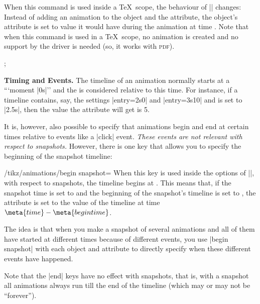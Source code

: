 \begin{command}{\pgfsnapshot{}}
    When this command is used inside a \TeX\ scope, the behaviour of
    |\pgfanimateattribute| changes: Instead of adding an animation to the
    object and the attribute, the object's attribute is set to value it would
    have during the animation at time . Note that when this command
    is used in a \TeX\ scope, no animation is created and no support by the
    driver is needed (so, it works with \textsc{pdf}).
\begin{codeexample}[]
\tikz [make snapshot of=1s,
       animate = { myself: = {
         :rotate = { 0s = "0", 2s = "90" },
         :color  = { 0s = "red", 2s = "green" },
         :line width = { 0s = "0mm", 4s = "4mm" }
       }}]
  ;
\end{codeexample}


    \medskip\textbf{Timing and Events.}
    The timeline of an animation normally starts at a ```moment |0s|'' and the
     is considered relative to this time. For instance, if a
    timeline contains, say, the settings |entry={2s}{0}| and |entry={3s}{10}|
    and  is set to |2.5s|, then the value the attribute will get is
    5.

    It is, however, also possible to specify that animations begin and end at
    certain times relative to events like a |click| event. \emph{These events
    are not relevant with respect to snapshots.} However, there is one key that
    allows you to specify the beginning of the snapshot timeline:
    \begin{key}{/tikz/animations/begin snapshot=}
        When this key is used inside the options of |\pgfanimateattribute|,
        with respect to snapshots, the timeline begins at .
        This means that, if the snapshot time is set to  and the
        beginning of the snapshot's timeline is set to , the
        attribute is set to the value of the timeline at time $\meta{time} -
        \meta{begin time}$.

        The idea is that when you make a snapshot of several animations and all
        of them have started at different times because of different events,
        you use |begin snapshot| with each object and attribute to directly
        specify when these different events have happened.
    \end{key}

    Note that the |end| keys have no effect with snapshots, that is, with a
    snapshot all animations always run till the end of the timeline (which may
    or may not be ``forever'').



\end{command}
